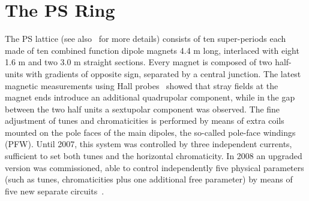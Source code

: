 \documentclass{article}
\begin{document}
\section{The PS Ring}\label{sec:appendix}
%
The PS lattice (see also~\cite{MTE-prog,PS50V1,PSDR} for more details) consists of ten super-periods each made of ten combined function dipole magnets 4.4 m long, interlaced with eight 1.6 m and two 3.0 m straight sections. Every magnet is composed of two half-units with gradients of opposite sign, separated by a central junction. The latest magnetic measurements using Hall probes~\cite{PS50V1} showed that stray fields at the magnet ends introduce an additional quadrupolar component, while in the gap between the two half units a sextupolar component was observed. The fine adjustment of tunes and chromaticities is performed by means of extra coils mounted on the pole faces of the main dipoles, the so-called pole-face windings (PFW). Until 2007, this system was controlled by three independent currents, sufficient to set both tunes and the horizontal chromaticity. In 2008 an upgraded version was commissioned, able to control independently five physical parameters (such as tunes, chromaticities plus one additional free parameter) by means of five new separate circuits~\cite{Burnet}.
\end{document}
